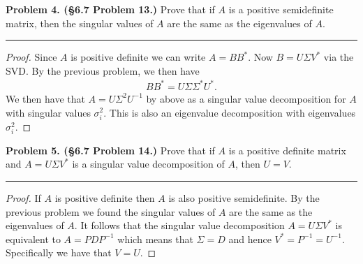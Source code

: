 \documentclass[leqno]{article}
\theoremstyle{nonumberplain}
\newtheorem{proof}{Proof}
\begin{document}


\noindent\textbf{Problem 4. (\S 6.7  Problem 13.)} Prove that if $A$ is a positive semidefinite matrix, then the singular values of $A$ are the same as the eigenvalues of $A$.

\noindent\rule[0.5ex]{\linewidth}{1pt}

\begin{proof}
Since $A$ is positive definite we can write $A=BB^*$. Now $B=U\Sigma V^*$ via the SVD. By the previous problem, we then have 
\begin{align*}
BB^* = U\Sigma \Sigma^* U^*.
\end{align*}
We then have that $A=U\Sigma^2 U^{-1}$ by above as a singular value decomposition for $A$ with singular values $\sigma_i^2$. This is also an eigenvalue decomposition with eigenvalues $\sigma_i^2$.   
\end{proof}

\pagebreak





\noindent\textbf{Problem 5. (\S 6.7 Problem 14.)} Prove that if $A$ is a positive definite matrix and $A=U\Sigma V^*$ is a singular value decomposition of $A$, then $U=V$.

\noindent\rule[0.5ex]{\linewidth}{1pt}

\begin{proof}
If $A$ is positive definite then $A$ is also positive semidefinite. By the previous problem we found the singular values of $A$ are the same as the eigenvalues of $A$. It follows that the singular value decomposition $A=U\Sigma V^*$ is equivalent to $A=PDP^{-1}$ which means that $\Sigma = D$ and hence $V^*=P^{-1}=U^{-1}$. Specifically we have that $V=U$.
\end{proof}

\pagebreak
\end{document}
